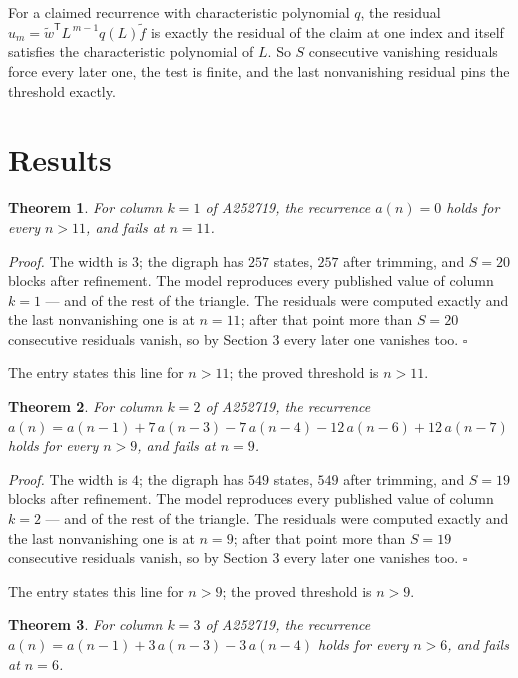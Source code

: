\documentclass[11pt]{article}
\newtheorem{theorem}{Theorem}
\theoremstyle{definition}
\begin{document}
For a claimed recurrence with characteristic polynomial $q$, the residual $u_m = \tilde w^{\mathsf T}L^{\,m-1}q(L)\tilde f$ is exactly the residual of the claim at one index and itself satisfies the characteristic polynomial of $L$. So $S$ consecutive vanishing residuals force every later one, the test is finite, and the last nonvanishing residual pins the threshold exactly.

\section{Results}

\begin{theorem} For column $k = 1$ of A252719, the recurrence $a(n) = 0$ holds for every $n > 11$, and fails at $n = 11$.\end{theorem}

{\itshape Proof.} The width is $3$; the digraph has $257$ states, $257$ after trimming, and $S = 20$ blocks after refinement. The model reproduces every published value of column $k = 1$ --- and of the rest of the triangle. The residuals were computed exactly and the last nonvanishing one is at $n = 11$; after that point more than $S = 20$ consecutive residuals vanish, so by Section 3 every later one vanishes too. $\square$

The entry states this line for $n > 11$; the proved threshold is $n > 11$.

\begin{theorem} For column $k = 2$ of A252719, the recurrence $a(n) = a(n-1) + 7\,a(n-3) - 7\,a(n-4) - 12\,a(n-6) + 12\,a(n-7)$ holds for every $n > 9$, and fails at $n = 9$.\end{theorem}

{\itshape Proof.} The width is $4$; the digraph has $549$ states, $549$ after trimming, and $S = 19$ blocks after refinement. The model reproduces every published value of column $k = 2$ --- and of the rest of the triangle. The residuals were computed exactly and the last nonvanishing one is at $n = 9$; after that point more than $S = 19$ consecutive residuals vanish, so by Section 3 every later one vanishes too. $\square$

The entry states this line for $n > 9$; the proved threshold is $n > 9$.

\begin{theorem} For column $k = 3$ of A252719, the recurrence $a(n) = a(n-1) + 3\,a(n-3) - 3\,a(n-4)$ holds for every $n > 6$, and fails at $n = 6$.\end{theorem}
\end{document}
